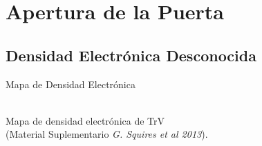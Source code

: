 \documentclass[8pt]{beamer}
\begin{document}
%
%

\section{Apertura de la Puerta}
\subsection{Densidad Electrónica Desconocida}
\begin{frame}{Mapa de Densidad Electrónica}
\centering
{} \\
\centering Mapa de densidad electrónica de TrV \\(Material Suplementario \textit{G. Squires et al 2013}).
\end{frame}
\end{document}
